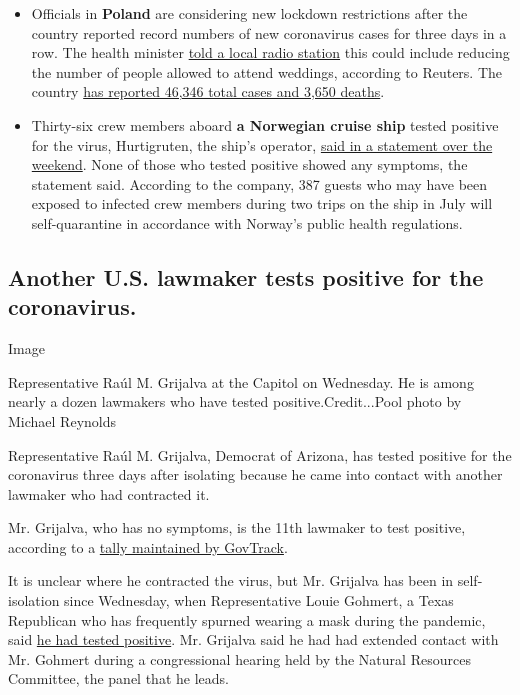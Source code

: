 \begin{itemize}
\item
  Officials in \textbf{Poland} are considering new lockdown restrictions
  after the country reported record numbers of new coronavirus cases for
  three days in a row. The health minister
  \href{https://news.yahoo.com/poland-reports-record-rise-virus-090641415.html}{told
  a local radio station} this could include reducing the number of
  people allowed to attend weddings, according to Reuters. The country
  \href{https://www.nytimes3xbfgragh.onion/interactive/2020/world/coronavirus-maps.html\#countries}{has
  reported 46,346 total cases and 3,650 deaths}.
\item
  Thirty-six crew members aboard \textbf{a Norwegian cruise ship} tested
  positive for the virus, Hurtigruten, the ship's operator,
  \href{https://presse.hurtigruten.no/pressreleases/33-hurtigruten-crew-members-tested-positive-for-covid-19-3024215}{said
  in a statement over the weekend}. None of those who tested positive
  showed any symptoms, the statement said. According to the company, 387
  guests who may have been exposed to infected crew members during two
  trips on the ship in July will self-quarantine in accordance with
  Norway's public health regulations.
\end{itemize}

\hypertarget{another-us-lawmaker-tests-positive-for-the-coronavirus}{%
\subsection{Another U.S. lawmaker tests positive for the
coronavirus.}\label{another-us-lawmaker-tests-positive-for-the-coronavirus}}

Image

Representative Raúl M. Grijalva at the Capitol on Wednesday. He is among
nearly a dozen lawmakers who have tested positive.Credit...Pool photo by
Michael Reynolds

Representative Raúl M. Grijalva, Democrat of Arizona, has tested
positive for the coronavirus three days after isolating because he came
into contact with another lawmaker who had contracted it.

Mr. Grijalva, who has no symptoms, is the 11th lawmaker to test
positive, according to a
\href{https://slack-redir.net/link?url=https\%3A\%2F\%2Fwww.govtrack.us\%2Fcovid-19\%23legislators}{tally
maintained by GovTrack}.

It is unclear where he contracted the virus, but Mr. Grijalva has been
in self-isolation since Wednesday, when Representative Louie Gohmert, a
Texas Republican who has frequently spurned wearing a mask during the
pandemic, said
\href{https://www.nytimes3xbfgragh.onion/2020/07/29/us/politics/louie-gohmert-positive-coronavirus-mask.html}{he
had tested positive}. Mr. Grijalva said he had had extended contact with
Mr. Gohmert during a congressional hearing held by the Natural Resources
Committee, the panel that he leads.

